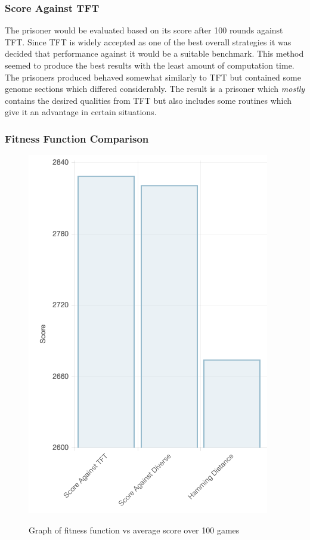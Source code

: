 \documentclass[12pt]{article}
\begin{document}
\subsubsection{Score Against TFT}
\label{tft}

The prisoner would be evaluated based on its score after 100 rounds against
TFT.  Since TFT is widely accepted as one of the best overall strategies it was
decided that performance against it would be a suitable benchmark.
This method seemed to produce the best results with the least
amount of computation time.  The prisoners produced behaved somewhat similarly
to TFT but contained some genome sections which differed considerably.  The result
is a prisoner which \textit{mostly} contains the desired qualities from TFT
but also includes some routines which give it an advantage in certain situations.

\clearpage
\pagebreak

\subsubsection{Fitness Function Comparison}

\begin{figure}[h]
    \label{fig2}
    \caption{Graph of fitness function vs average score over 100 games}
    \centering
    \includegraphics[scale=0.5]{figures/fit_score.png}
    \label{fig1}
\end{figure}
\end{document}
